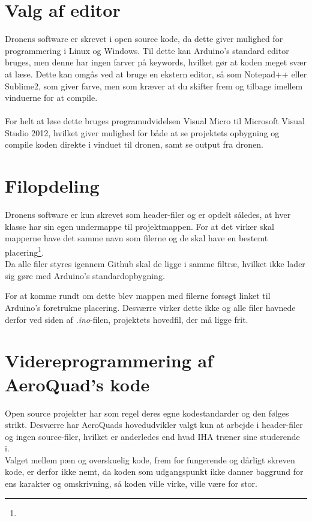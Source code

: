 \documentclass[Main]{subfiles}
\begin{document}
\section{Valg af editor}\label{sec:software}
Dronens software er skrevet i open source kode, da dette giver mulighed for programmering i Linux og Windows\cite{AQ-software}.
Til dette kan Arduino's standard editor bruges, men denne har ingen farver på keywords, hvilket gør at koden meget svær at læse.
Dette kan omgås ved at bruge en ekstern editor, så som Notepad++ eller Sublime2, som giver farve, men som kræver at du skifter frem og tilbage imellem vinduerne for at compile.
\\
\\
For helt at løse dette bruges programudvidelsen Visual Micro\cite{VM} til Microsoft Visual Studio 2012, hvilket giver mulighed for både at se projektets opbygning og compile koden direkte i vinduet til dronen, samt se output fra dronen.



\section{Filopdeling}
Dronens software er kun skrevet som header-filer og er opdelt således, at hver klasse har sin egen undermappe til projektmappen.
For at det virker skal mapperne have det samme navn som filerne og de skal have en bestemt placering\footnote{}.
\\
Da alle filer styres igennem Github skal de ligge i samme filtræ, hvilket ikke lader sig gøre med Arduino's standardopbygning.


For at komme rundt om dette blev mappen med filerne forsøgt linket til Arduino's foretrukne  placering.
Desværre virker dette ikke og alle filer havnede derfor ved siden af \textit{.ino}-filen, projektets hovedfil, der må ligge frit.


\section{Videreprogrammering af AeroQuad's kode}
Open source projekter har som regel deres egne kodestandarder og den følges strikt.
Desværre har AeroQuads hovedudvikler valgt kun at arbejde i header-filer og ingen source-filer, hvilket er anderledes end hvad IHA træner sine studerende i.
\\
Valget mellem pæn og overskuelig kode, frem for fungerende og dårligt skreven kode, er derfor ikke nemt, da koden som udgangspunkt ikke danner baggrund for ens karakter og omskrivning, så koden ville virke, ville være for stor.
\end{document}
